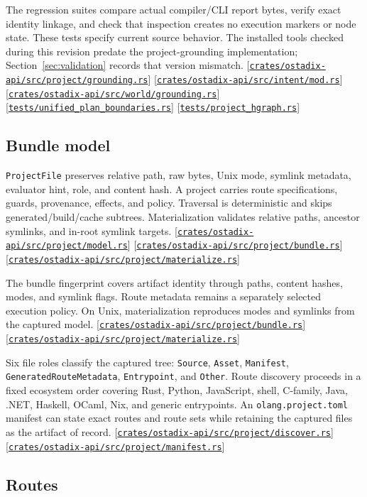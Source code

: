 \documentclass[11pt,oneside]{article}
\newcommand{\src}[1]{\textcolor{OSlate}{\scriptsize[\href{https://github.com/lostadi/OSTADIX/blob/c0b02c326b2329a95ba52447c7180bc93957cd57/#1}{\nolinkurl{#1}}]}\allowbreak}
\begin{document}
The regression suites compare actual compiler/CLI report bytes, verify exact
identity linkage, and check that inspection creates no execution markers or
node state. These tests specify current source behavior. The installed tools
checked during this revision predate the project-grounding implementation;
Section~\ref{sec:validation} records that version mismatch.
\src{crates/ostadix-api/src/project/grounding.rs}
\src{crates/ostadix-api/src/intent/mod.rs}
\src{crates/ostadix-api/src/world/grounding.rs}
\src{tests/unified_plan_boundaries.rs}
\src{tests/project_hgraph.rs}

\subsection{Bundle model}

\texttt{ProjectFile} preserves relative path, raw bytes, Unix mode, symlink
metadata, evaluator hint, role, and content hash. A project carries route
specifications, guards, provenance, effects, and policy. Traversal is
deterministic and skips generated/build/cache subtrees. Materialization
validates relative paths, ancestor symlinks, and in-root symlink targets.
\src{crates/ostadix-api/src/project/model.rs}
\src{crates/ostadix-api/src/project/bundle.rs}
\src{crates/ostadix-api/src/project/materialize.rs}

The bundle fingerprint covers artifact identity through paths, content hashes,
modes, and symlink flags. Route metadata remains a separately selected
execution policy. On Unix, materialization reproduces modes and symlinks from
the captured model.
\src{crates/ostadix-api/src/project/bundle.rs}
\src{crates/ostadix-api/src/project/materialize.rs}

Six file roles classify the captured tree: \texttt{Source}, \texttt{Asset},
\texttt{Manifest}, \texttt{GeneratedRoute}\newline\texttt{Metadata},
\texttt{Entrypoint}, and
\texttt{Other}. Route discovery proceeds in a fixed ecosystem order covering
Rust, Python, JavaScript, shell, C-family, Java, .NET, Haskell, OCaml, Nix, and
generic entrypoints. An \texttt{olang.project.toml} manifest can state exact
routes and route sets while retaining the captured files as the artifact of
record. \src{crates/ostadix-api/src/project/discover.rs}
\src{crates/ostadix-api/src/project/manifest.rs}

\subsection{Routes}
\end{document}
